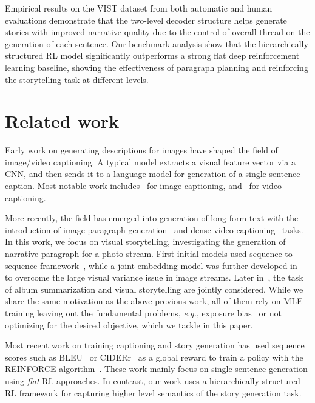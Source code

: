 \documentclass[letterpaper]{article} \usepackage{aaai19}  \usepackage{times}  \usepackage{helvet}  \usepackage{courier}  \usepackage{url}  \usepackage{graphicx}
\begin{document}
Empirical results on the VIST dataset from both automatic and human evaluations demonstrate that the two-level decoder structure helps generate stories with improved narrative quality due to the control of overall thread on the generation of each sentence. 
Our benchmark analysis show that the hierarchically structured RL model significantly outperforms a strong flat deep reinforcement learning baseline, showing the effectiveness of paragraph planning and reinforcing the storytelling task at different levels.

\section{Related work}\label{sec:RelatedWork}
Early work on generating descriptions for images have shaped the field of image/video captioning. A typical model extracts a visual feature vector via a CNN, and then sends it to a language model for generation of a single sentence caption. Most notable work includes~\cite{vinyals2015show,xu2015show,fang2015captions,donahue2015long,karpathy2015deep} for image captioning, and~\cite{venugopalan2015sequence,pan2015hierarchical,yu2016video,pan2016joint,pu2018adaptive} for video captioning. 

More recently, the field has emerged into generation of long form text with the introduction of image paragraph generation~\cite{krause2016hierarchical} and dense video captioning~\cite{krishna2017dense} tasks. In this work, we focus on visual storytelling, investigating the generation of narrative paragraph for a photo stream. First initial models used sequence-to-sequence framework~\cite{huang2016visual,liu2017let}, while a joint embedding model was further developed in~\cite{liu2017let} to overcome the large visual variance issue in image streams. Later in~\cite{yu2017hierarchically}, the task of album summarization and visual storytelling are jointly considered. While we share the same motivation as the above previous work, all of them rely on MLE training leaving out the fundamental problems, \emph{e.g.}, exposure bias~\cite{bengio2015scheduled} or not optimizing for the desired objective, which we tackle in this paper.

Most recent work on training captioning and story generation has used sequence scores such as BLEU~\cite{ranzato2015sequence} or CIDERr~\cite{Rennie2016Self}  as a global reward to train a policy with the REINFORCE algorithm~\cite{williams1992simple}. These work mainly focus on single sentence generation using \emph{flat} RL approaches. In contrast, our work uses a hierarchically structured RL framework for capturing higher level semantics of the story generation task.
\end{document}
